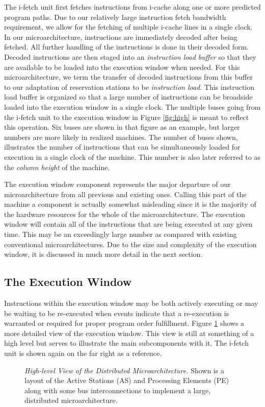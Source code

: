 \documentclass[10pt,dvips]{article}
\begin{document}
The i-fetch unit first fetches instructions from i-cache
along one or more predicted program paths.
Due to our relatively large instruction fetch bandwidth
requirement, we allow for the fetching of multiple i-cache
lines in a single clock.
In our microarchitecture, instructions are immediately
decoded after being fetched.
All further handling of the instructions is done in their decoded
form.
Decoded instructions are then staged
into an \textit{instruction load buffer}
so that they are available to be loaded into the execution
window when needed.  
For this microarchitecture, we term the
transfer of decoded instructions from this buffer to our adaptation of
reservation stations to be \textit{instruction load}.
This instruction load buffer is organized so that
a large number of instructions can be broadside loaded into the
execution window in a single clock.
The multiple buses going from the i-fetch unit to the
execution window in Figure \ref{fig:high} is meant to
reflect this operation.  
Six buses are shown in that figure
as an example, but larger numbers are more likely in
realized machines.
The number of buses shown, illustrates the
number of instructions that can be simultaneously loaded for execution 
in a single clock of the machine.  
This number is also later referred to as 
the \textit{column height} of the machine.  

The execution window component 
represents the major departure of our microarchitecture
from all previous and existing ones.
Calling this part of the machine a component is actually somewhat
misleading since it is the majority of the hardware resources
for the whole of the microarchitecture.
The execution window will contain all of the instructions
that are being executed at any given time.  
This may be an
exceedingly large number as compared with 
existing conventional microarchitectures.
Due to the size and complexity of the execution window, it is
discussed in much more detail in the next section.
%
\subsection{The Execution Window}
%
Instructions within the execution window may be both actively 
executing
or may be waiting to be re-executed when events indicate that
a re-execution is warranted or required for proper program order
fulfillment.
Figure \ref{fig:window} shows a more detailed view
of the execution window.
This view is still at something of a high level but serves to
illustrate the main subcomponents with it.
The i-fetch unit is shown again on the far right as a reference.
%
\begin{figure}
\centering
{}
\caption{{\em High-level View of the Distributed Microarchitecture.} 
Shown is a layout of the Active Stations (AS) and Processing Elements (PE)
along with some bus interconnections to implement a large,
distributed microarchitecture.}
\label{fig:window}
\end{figure}
\end{document}
